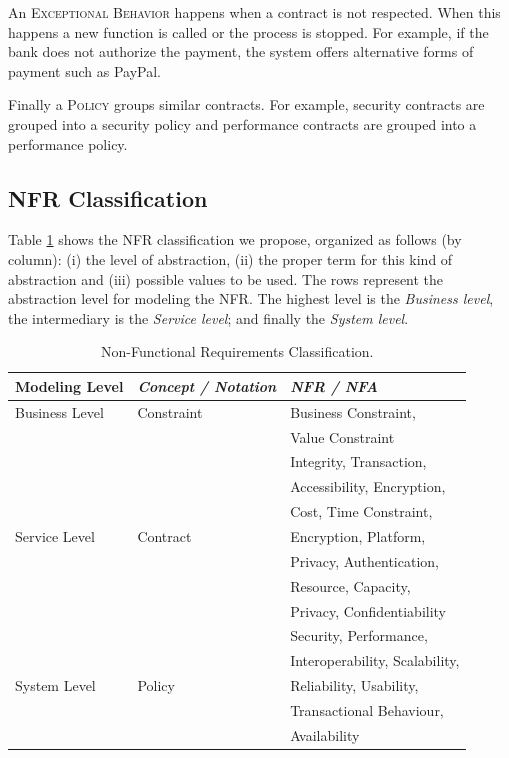  
An \textsc{Exceptional Behavior} happens when a contract is not respected. When
this happens a new function is called or the process is stopped. For example, if
the bank does not authorize the payment, the system offers alternative forms
of payment such as PayPal.

Finally a \textsc{Policy} groups similar contracts. For example, security
contracts are grouped into a security policy and performance contracts are
grouped into a performance policy.


\subsection{NFR Classification}
\label{sec:nfr-classification}

Table \ref{tab:result04} shows the NFR classification we propose, organized
 as follows (by column): (i) the level of abstraction, (ii) the proper term for
 this kind of abstraction and (iii) possible values to be used. The rows
 represent the abstraction level for modeling the NFR. The highest level is the
 \textit{Business level}, the intermediary is the \textit{Service level}; and
 finally the \textit{System level}.  

\begin{table}[ht!]
\centering
\begin{tabular}{l|l|l}
  \hline 
  \hline
   \textbf{Modeling Level} & \textbf{\textit{Concept / Notation}} & \textbf{\textit{NFR / NFA}}  
   \\
  \hline
  \hline  
  Business Level & Constraint  & Business Constraint,    
 \\  
  &   & Value Constraint\\
  \hline   
   &  & Integrity, Transaction,  \\
   &  & Accessibility, Encryption, \\
   &  & Cost, Time Constraint, \\
  Service Level & Contract & Encryption, Platform, \\
   &  & Privacy, Authentication, \\
   &  & Resource, Capacity, \\
   &  & Privacy, Confidentiability 
   \\  \hline
   &  & Security, Performance,\\ 
   & & Interoperability, Scalability,\\
  System Level & Policy & Reliability, Usability,\\
   & & Transactional Behaviour,\\
   & & Availability \\ 
   \hline
  \hline  
\end{tabular}
\caption{Non-Functional Requirements Classification.}
\label{tab:result04}
\end{table} 



